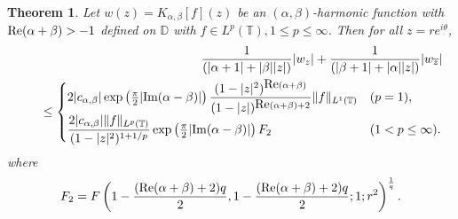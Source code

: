 \documentclass[11pt, reqno]{amsart}
\newtheorem{theorem}{Theorem}
\theoremstyle{definition}
\numberwithin{equation}{section}
\theoremstyle{remark}
\numberwithin{equation}{section}
\begin{document}
\begin{theorem}\label{t5}
	Let $w(z)=K_{\alpha,\beta}[f](z)$ be an $(\alpha,\beta)$-harmonic function with ${\rm Re}(\alpha+\beta)>-1$ defined on  $\mathbb{D}$  with $f\in L^p(\mathbb{T}),1\leq p\leq \infty$. Then for all  $z=re^{i\theta}$, 
	\begin{eqnarray*}
			&&\frac{1}{\left(|\alpha+1|+|\beta||z|\right)}|w_z|+\frac{1}{\left(|\beta+1|+|\alpha||z|\right)}|w_{\overline{z}}|\\&& \quad\leq\begin{cases}
				2|c_{\alpha,\beta}|\exp\left(\frac{\pi}{2}|\mbox{\rm Im}(\alpha- \beta)|\right)\dfrac{(1-|z|^2)^{\mbox{\rm Re}(\alpha+\beta)}}{(1-|z|)^{\mbox{\rm Re}(\alpha+\beta)+2}}\|f\|_{L^1(\mathbb{T})} &  (p=1),\\\dfrac{2|c_{\alpha,\beta}|\|f\|_{L^p(\mathbb{T})}}{(1-|z|^2)^{1+1/p}}\exp\left(\frac{\pi}{2}|\mbox{\rm Im}(\alpha- \beta)|\right)F_2&(1<p\leq \infty).
			\end{cases}
		\end{eqnarray*}
		where \begin{equation}\label{00}F_2=F\left(1-\frac{(\text{\rm Re}(\alpha+\beta)+2)q}{2},1-\frac{(\text{\rm Re}(\alpha+\beta)+2)q}{2};1;r^2\right)^{\frac{1}{q}}.\end{equation}
\end{theorem}
\end{document}
